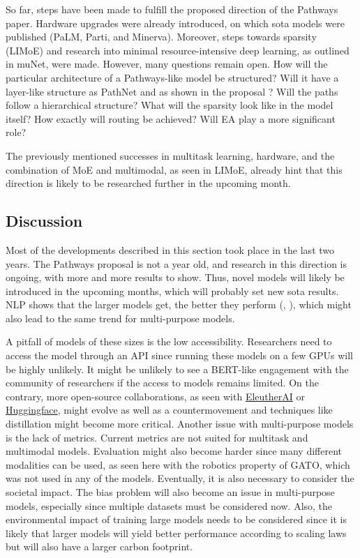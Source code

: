 \documentclass[
]{krantz}
\begin{document}
So far, steps have been made to fulfill the proposed direction of the Pathways paper. Hardware upgrades were already introduced, on which sota models were published (PaLM, Parti, and Minerva). Moreover, steps towards sparsity (LIMoE) and research into minimal resource-intensive deep learning, as outlined in muNet, were made. However, many questions remain open. How will the particular architecture of a Pathways-like model be structured? Will it have a layer-like structure as PathNet and as shown in the proposal \citep{Dean21}? Will the paths follow a hierarchical structure? What will the sparsity look like in the model itself? How exactly will routing be achieved? Will EA play a more significant role?

The previously mentioned successes in multitask learning, hardware, and the combination of MoE and multimodal, as seen in LIMoE, already hint that this direction is likely to be researched further in the upcoming month.

\hypertarget{discussion-3}{%
\subsection{Discussion}\label{discussion-3}}

Most of the developments described in this section took place in the last two years. The Pathways proposal is not a year old, and research in this direction is ongoing, with more and more results to show.
Thus, novel models will likely be introduced in the upcoming months, which will probably set new sota results. NLP shows that the larger models get, the better they perform (\citet{Chowdhery2022}, \citet{brown2020language}), which might also lead to the same trend for multi-purpose models.

A pitfall of models of these sizes is the low accessibility. Researchers need to access the model through an API since running these models on a few GPUs will be highly unlikely. It might be unlikely to see a BERT-like engagement with the community of researchers if the access to models remains limited. On the contrary, more open-source collaborations, as seen with \href{www.eleuther.ai}{EleutherAI} or \href{www.huggingface.co}{Huggingface}, might evolve as well as a countermovement and techniques like distillation \citep{Hinton2015} might become more critical.
Another issue with multi-purpose models is the lack of metrics. Current metrics are not suited for multitask and multimodal models. Evaluation might also become harder since many different modalities can be
used, as seen here with the robotics property of GATO, which was not used in any of the models.
Eventually, it is also necessary to consider the societal impact. The bias problem will also become an issue in multi-purpose models, especially since multiple datasets must be considered now. Also, the environmental impact of training large models needs to be considered since it is likely that larger models will yield better performance according to scaling laws \citep{Reed2022} but will also have a larger carbon footprint.
\end{document}
